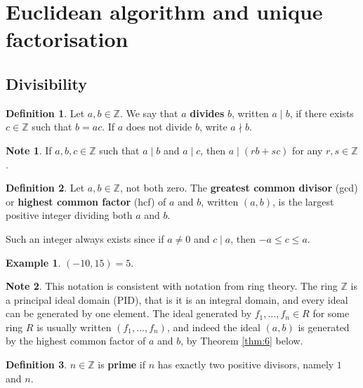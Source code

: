 \documentclass{article}
\newcommand{\Z}{\mathbb{Z}}
\newcommand{\rb}[1]{\left( #1 \right)}
\theoremstyle{definition}\newtheorem{definition}{Definition}
\theoremstyle{definition}\newtheorem*{remark}{Remark}
\theoremstyle{definition}\newtheorem*{example}{Example}
\theoremstyle{definition}\newtheorem*{note}{Note}
\begin{document}
\section{Euclidean algorithm and unique factorisation}

\subsection{Divisibility}

\begin{definition}
Let $ a, b \in \Z $. We say that $ a $ \textbf{divides} $ b $, written $ a \mid b $, if there exists $ c \in \Z $ such that $ b = ac $. If $ a $ does not divide $ b $, write $ a \nmid b $.
\end{definition}

\begin{note}
If $ a, b, c \in \Z $ such that $ a \mid b $ and $ a \mid c $, then $ a \mid \rb{rb + sc} $ for any $ r, s \in \Z $.
\end{note}

\begin{definition}
Let $ a, b \in \Z $, not both zero. The \textbf{greatest common divisor} (gcd) or \textbf{highest common factor} (hcf) of $ a $ and $ b $, written $ \rb{a, b} $, is the largest positive integer dividing both $ a $ and $ b $.
\end{definition}

Such an integer always exists since if $ a \ne 0 $ and $ c \mid a $, then $ -a \le c \le a $.

\begin{example}
$ \rb{-10, 15} = 5 $.
\end{example}

\begin{note}
This notation is consistent with notation from ring theory. The ring $ \Z $ is a principal ideal domain (PID), that is it is an integral domain, and every ideal can be generated by one element. The ideal generated by $ f_1, \dots, f_n \in R $ for some ring $ R $ is usually written $ \rb{f_1, \dots, f_n} $, and indeed the ideal $ \rb{a, b} $ is generated by the highest common factor of $ a $ and $ b $, by Theorem \ref{thm:6} below.
\end{note}

\begin{definition}
$ n \in \Z $ is \textbf{prime} if $ n $ has exactly two positive divisors, namely $ 1 $ and $ n $.
\end{definition}
\end{document}
